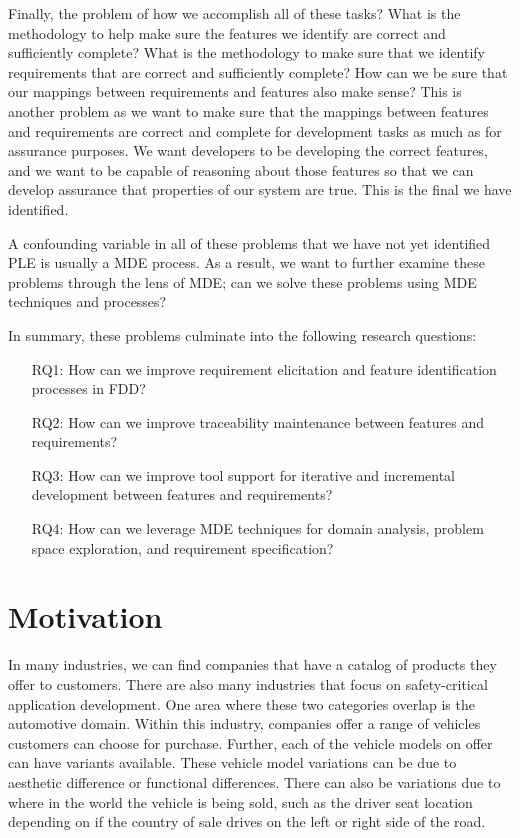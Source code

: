 Finally, the problem of how we accomplish all of these tasks? What is the methodology to help make sure the features we identify are correct and sufficiently complete? What is the methodology to make sure that we identify requirements that are correct and sufficiently complete? How can we be sure that our mappings between requirements and features also make sense? This is another problem as we want to make sure that the mappings between features and requirements are correct and complete for development tasks as much as for assurance purposes. We want developers to be developing the correct features, and we want to be capable of reasoning about those features so that we can develop assurance that properties of our system are true. This is the final we have identified.

A confounding variable in all of these problems that we have not yet identified \ac{PLE} is usually a \ac{MDE} process. As a result, we want to further examine these problems through the lens of \ac{MDE}; can we solve these problems using \ac{MDE} techniques and processes? 

In summary, these problems culminate into the following research questions:
\begin{enumerate}
	\item[RQ1: ]\label{RQ:1} How can we improve requirement elicitation and feature identification processes in \ac{FDD}?
	\item[RQ2: ]\label{RQ:2} How can we improve traceability maintenance between features and requirements?
	\item[RQ3: ]\label{RQ:3} How can we improve tool support for iterative and incremental development between features and requirements?
	\item[RQ4: ]\label{RQ:4} How can we leverage \ac{MDE} techniques for domain analysis, problem space exploration, and requirement specification?
\end{enumerate}


\section{Motivation}

In many industries, we can find companies that have a catalog of products they offer to customers. There are also many industries that focus on safety-critical application development. One area where these two categories overlap is the automotive domain. Within this industry, companies offer a range of vehicles customers can choose for purchase. Further, each of the vehicle models on offer can have variants available. These vehicle model variations can be due to aesthetic difference or functional differences. There can also be variations due to where in the world the vehicle is being sold, such as the driver seat location depending on if the country of sale drives on the left or right side of the road. 

